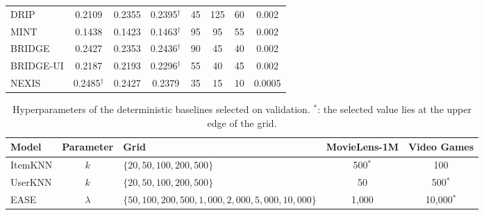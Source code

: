 \documentclass[10pt,a4paper]{article}
\begin{document}
\begin{table}[!ht]
\begin{adjustbox}{max width=\textwidth}
\begin{tabular}{@{}l ccc ccc c@{}}
DRIP & 0.2109 & 0.2355 & 0.2395$^{\dagger}$ & 45 & 125 & 60 & 0.002 \\
MINT & 0.1438 & 0.1423 & 0.1463$^{\dagger}$ & 95 & 95 & 55 & 0.002 \\
BRIDGE & 0.2427 & 0.2353 & 0.2436$^{\dagger}$ & 90 & 45 & 40 & 0.002 \\
BRIDGE-UI & 0.2187 & 0.2193 & 0.2296$^{\dagger}$ & 55 & 40 & 45 & 0.002 \\
NEXIS & 0.2485$^{\dagger}$ & 0.2427 & 0.2379 & 35 & 15 & 10 & 0.0005 \\
\bottomrule
\end{tabular}
\end{adjustbox}
\end{table}

\begin{table}[!ht]
\centering
\caption{Hyperparameters of the deterministic baselines selected on validation. $^{\ast}$: the selected value lies at the upper edge of the grid.}
\label{tab:s_det}
\footnotesize
\begin{adjustbox}{max width=\textwidth}
\begin{tabular}{@{}l c l c c@{}}
\toprule
\textbf{Model} & \textbf{Parameter} & \textbf{Grid} & \textbf{MovieLens-1M} & \textbf{Video Games} \\
\midrule
ItemKNN & $k$ & $\{20, 50, 100, 200, 500\}$ & 500$^{\ast}$ & 100 \\
UserKNN & $k$ & $\{20, 50, 100, 200, 500\}$ & 50 & 500$^{\ast}$ \\
EASE & $\lambda$ & $\{50, 100, 200, 500, 1{,}000, 2{,}000, 5{,}000, 10{,}000\}$ & 1{,}000 & 10{,}000$^{\ast}$ \\
\bottomrule
\end{tabular}
\end{adjustbox}
\end{table}
\end{document}
